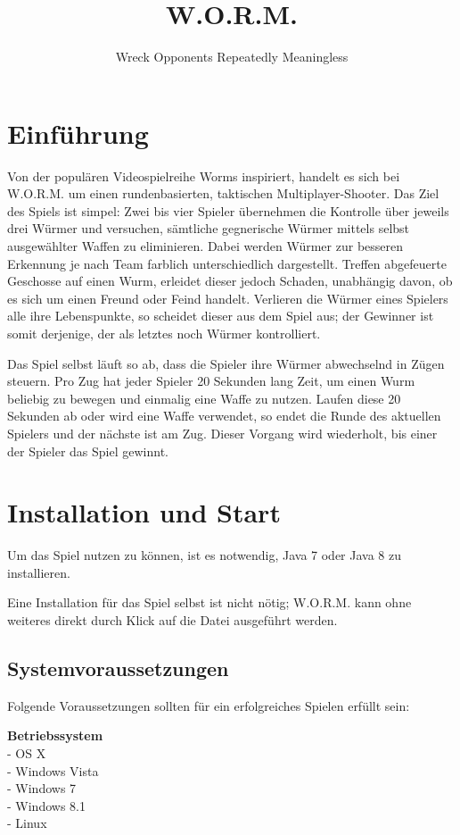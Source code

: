 \documentclass{scrreprt}
\title{W.O.R.M.}
\author{Wreck Opponents Repeatedly Meaningless}
\begin{document}
 
\maketitle
\tableofcontents
\thispagestyle{empty}
\newpage
\setcounter{page}{3}

\chapter{Einführung}
Von der populären Videospielreihe Worms inspiriert, handelt es sich bei W.O.R.M. um einen rundenbasierten, taktischen Multiplayer-Shooter. Das Ziel des Spiels ist simpel:
Zwei bis vier Spieler übernehmen die Kontrolle über jeweils drei Würmer und versuchen, sämtliche gegnerische Würmer mittels selbst ausgewählter Waffen zu eliminieren. Dabei werden Würmer zur besseren Erkennung je nach Team farblich unterschiedlich dargestellt. Treffen abgefeuerte Geschosse auf einen Wurm, erleidet dieser jedoch Schaden, unabhängig davon, ob es sich um einen Freund oder Feind handelt.
Verlieren die Würmer eines Spielers alle ihre Lebenspunkte, so scheidet dieser aus dem Spiel aus; der Gewinner ist somit derjenige, der als letztes noch Würmer kontrolliert.

Das Spiel selbst läuft so ab, dass die Spieler ihre Würmer abwechselnd in Zügen steuern. Pro Zug hat jeder Spieler 20 Sekunden lang Zeit, um einen Wurm beliebig zu bewegen und einmalig eine Waffe zu nutzen. Laufen diese 20 Sekunden ab oder wird eine Waffe verwendet, so endet die Runde des aktuellen Spielers und der nächste ist am Zug. Dieser Vorgang wird wiederholt, bis einer der Spieler das Spiel gewinnt.

\chapter{Installation und Start}
Um das Spiel nutzen zu können, ist es notwendig, Java 7 oder Java 8 zu installieren.

Eine Installation für das Spiel selbst ist nicht nötig; W.O.R.M. kann ohne weiteres direkt durch Klick auf die Datei ausgeführt werden.

\section{Systemvoraussetzungen}

Folgende Voraussetzungen sollten für ein erfolgreiches Spielen erfüllt sein:

\textbf{Betriebssystem}
\\- OS X
\\- Windows Vista
\\- Windows 7
\\- Windows 8.1
\\- Linux
\end{document}

